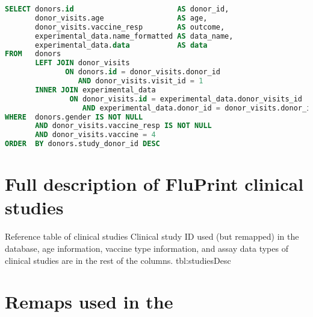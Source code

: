\begin{appendices}
\begin{minipage}{\linewidth}
\begin{lstlisting}[language=sql, caption=Query of initial SIMON data, label={lst:QueryTemplate}]
SELECT donors.id                        AS donor_id,
       donor_visits.age                 AS age,
       donor_visits.vaccine_resp        AS outcome,
       experimental_data.name_formatted AS data_name,
       experimental_data.data           AS data
FROM   donors
       LEFT JOIN donor_visits
              ON donors.id = donor_visits.donor_id
                 AND donor_visits.visit_id = 1
       INNER JOIN experimental_data
               ON donor_visits.id = experimental_data.donor_visits_id
                  AND experimental_data.donor_id = donor_visits.donor_id
WHERE  donors.gender IS NOT NULL
       AND donor_visits.vaccine_resp IS NOT NULL
       AND donor_visits.vaccine = 4
ORDER  BY donors.study_donor_id DESC
\end{lstlisting}
\end{minipage}

    \section{Full description of FluPrint clinical studies}
{Reference table of clinical studies}
{Clinical study ID used (but remapped) in the database, age information,
vaccine type information, and assay data types of clinical studies are in the
rest of the columns.}
{tbl:studiesDesc}


    \section{Remaps used in the \flup}


\end{appendices}
